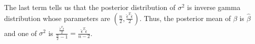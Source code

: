 \documentclass{article}
\begin{document}
		The last term tells us that the posterior distribution of $\sigma^2$ is inverse gamma distribution whose parameters are $(\frac{n}{2}, \frac{\hat{\epsilon}^T\hat{\epsilon}}{2})$.
		Thus, the posterior mean of $\beta$ is $\hat{\beta}$ and one of $\sigma^2$ is $\frac{\frac{\hat{\epsilon}^T\hat{\epsilon}}{2}}{\frac{n}{2} -1} = \frac{\hat{\epsilon}^T\hat{\epsilon}}{n-2}$.
	
	
	
	
	
	
\end{document}
